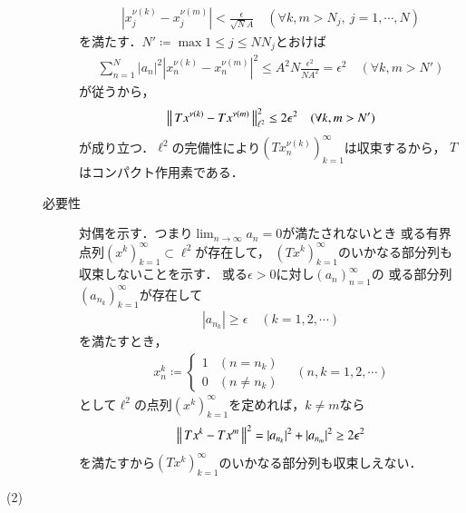 \begin{prf}
\begin{description}
\begin{description}
						\begin{align}
							\left|x_j^{\nu(k)} - x_j^{\nu(m)} \right| < \frac{\epsilon}{\sqrt{N} A}
							\quad (\forall k,m > N_j,\ j=1,\cdots,N)
						\end{align}
						を満たす．$N' \coloneqq \max{1 \leq j \leq N}{N_j}$とおけば
						\begin{align}
							\sum_{n=1}^{N} |a_n|^2 \left|x_n^{\nu(k)} - x_n^{\nu(m)} \right|^2
							\leq A^2 N \frac{\epsilon^2}{N A^2} = \epsilon^2
							\quad (\forall k,m > N')
						\end{align}
						が従うから，
						\begin{align}
							\left\|\, T x^{\nu(k)} - T x^{\nu(m)}\, \right\|_{\ell^2}^2 \leq 2 \epsilon^2 \quad (\forall k,m > N')
						\end{align}
						が成り立つ．$\ell^2$の完備性により$\left(T x_n^{\nu(k)} \right)_{k=1}^{\infty}$は収束するから，
						$T$はコンパクト作用素である．
						
					\item[必要性]
						対偶を示す．つまり$\lim_{n \to \infty} a_n = 0$が満たされないとき
						或る有界点列$(x^k)_{k=1}^{\infty} \subset \ell^2$が存在して，
						$(T x^k)_{k=1}^{\infty}$のいかなる部分列も収束しないことを示す．
						或る$\epsilon > 0$に対し$(a_n)_{n=1}^{\infty}$の
						或る部分列$\left(a_{n_k}\right)_{k=1}^{\infty}$が存在して
						\begin{align}
							\left| a_{n_k} \right| \geq \epsilon
							\quad (k=1,2,\cdots)
						\end{align}
						を満たすとき，
						\begin{align}
							x^k_n \coloneqq
							\begin{cases}
								1 & (n=n_k) \\
								0 & (n \neq n_k)
							\end{cases}
							\quad (n,k=1,2,\cdots)
						\end{align}
						として$\ell^2$の点列$(x^k)_{k=1}^{\infty}$を定めれば，$k \neq m$なら
						\begin{align}
							\left\|\, T x^k - T x^m\, \right\|_{}^2
							= |a_{n_k}|^2 + |a_{n_m}|^2
							\geq 2 \epsilon^2
						\end{align}
						を満たすから$(T x^k)_{k=1}^{\infty}$のいかなる部分列も収束しえない．
				\end{description}
			\item[(2)]
		\end{description}
	\end{prf}
	
